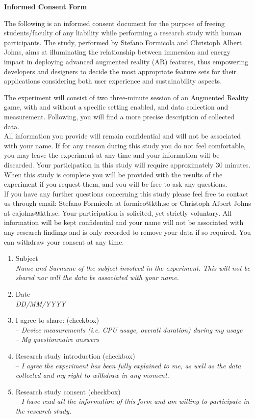 \documentclass[../II2202-proposal.tex]{subfiles}
\begin{document}
\textbf{Informed Consent Form}

The following is an informed consent document for the purpose of freeing students/faculty of any liability while performing a research study with human participants. 
The study, performed by Stefano Formicola and Christoph Albert Johns, aims at illuminating the relationship between immersion and energy impact in deploying advanced augmented reality (AR) features, thus empowering developers and designers to decide the most appropriate feature sets for their applications considering both user experience and sustainability aspects.

The experiment will consist of two three-minute session of an Augmented Reality game, with and without a specific setting enabled, and data collection and measurement. Following, you will find a more precise description of collected data. \\

All information you provide will remain confidential and will not be associated with your name. If for any reason during this study you do not feel comfortable, you may leave the experiment at any time and your information will be discarded.
Your participation in this study will require approximately 30 minutes. When this study is complete you will be provided with the results of the experiment if you request them, and you will be free to ask any questions. \\

If you have any further questions concerning this study please feel free to contact us through email: Stefano Formicola at formico@kth.se or Christoph Albert Johns at cajohns@kth.se.
Your participation is solicited, yet strictly voluntary. All information will be kept confidential and your name will not be associated with any research findings and is only recorded to remove your data if so required. You can withdraw your consent at any time.

\begin{enumerate}
    \item Subject\\
    \textit{Name and Surname of the subject involved in the experiment. This will not be shared nor will the data be associated with your name.}
    \item Date\\
    \textit{DD/MM/YYYY}
    \item I agree to share: (checkbox)\\
    -- \textit{Device measurements (i.e. CPU usage, overall duration) during my usage }\\
    -- \textit{My questionnaire answers}
    \item Research study introduction (checkbox)\\
    -- \textit{I agree the experiment has been fully explained to me, as well as the data collected and my right to withdraw in any moment.}
    \item Research study consent (checkbox)\\
    -- \textit{I have read all the information of this form and am willing to participate in the research study.}
\end{enumerate}
\end{document}
